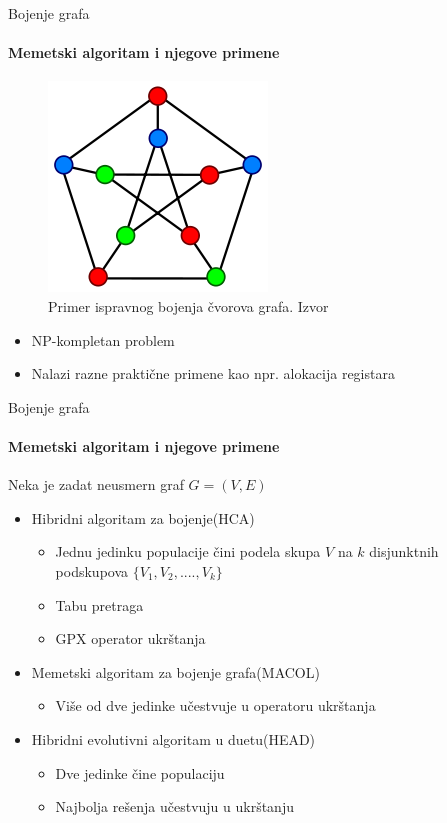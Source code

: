 \documentclass{beamer}
\begin{document}
\begin{frame}[fragile]{Bojenje grafa}
  \framesubtitle{Memetski algoritam i njegove primene}
    \begin{figure}[h!]
     	\centering
     	\includegraphics[scale=0.5]{bojene_grafa1}
        \caption{Primer ispravnog bojenja čvorova grafa. Izvor \cite{graph_coloring}}
    \end{figure}
    
    \begin{itemize}
        \item NP-kompletan problem
        \item Nalazi razne praktične primene kao npr. alokacija registara
    \end{itemize}
\end{frame}



\begin{frame}[fragile]{Bojenje grafa}
  \framesubtitle{Memetski algoritam i njegove primene}

Neka je zadat neusmern graf $G = (V, E)$

   \begin{itemize}
    \item{Hibridni algoritam za bojenje(HCA)}
        \begin{itemize}
            \item Jednu jedinku populacije čini podela skupa $V$ na $k$  disjunktnih podskupova $\{V_1, V_2, ...., V_k\}$
            \item Tabu pretraga
            \item GPX operator ukrštanja \cite{galinier1999hybrid}
        \end{itemize}
    \item{Memetski algoritam za bojenje grafa(MACOL)}
        \begin{itemize}
            \item Više od dve jedinke učestvuje u operatoru ukrštanja
        \end{itemize}
    \item{Hibridni evolutivni algoritam u duetu(HEAD)}
        \begin{itemize}
            \item Dve jedinke čine populaciju
            \item Najbolja rešenja učestvuju u ukrštanju
        \end{itemize}
  \end{itemize}
  

\end{frame}
\end{document}
